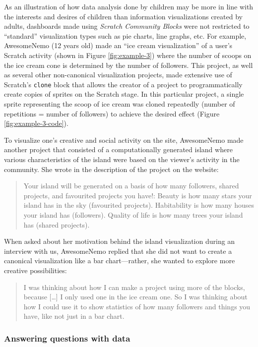 \documentclass{sigchi}
\begin{document}
As an illustration of how data analysis done by children may be more in line with the interests and desires of children than information visualizations created by adults, dashboards made using \emph{Scratch Community Blocks} were not restricted to ``standard'' visualization types such as pie charts, line graphs, etc. For example, AwesomeNemo (12 years old) made an ``ice cream visualization'' of a user's Scratch activity (shown in Figure \ref{fig:example-3}) where the number of scoops on the ice cream cone is determined by the number of followers. This project, as well as several other non-canonical visualization projects, made extensive use of Scratch's \texttt{clone} block that allows the creator of a project to programmatically create copies of sprites on the Scratch stage. In this particular project, a single sprite representing the scoop of ice cream was cloned repeatedly (number of repetitions = number of followers) to achieve the desired effect (Figure \ref{fig:example-3-code}).

To visualize one's creative and social activity on the site, AwesomeNemo made another project that consisted of a computationally generated island where various characteristics of the island were based on the viewer's activity in the community. She wrote in the description of the project on the website:

\begin{quote}
Your island will be generated on a basis of how many followers, shared projects, and favourited projects you have!: Beauty is how many stars your island has in the sky (favourited projects). Habitability is how many houses your island has (followers). Quality of life is how many trees your island has (shared projects).
\end{quote}

When asked about her motivation behind the island visualization during an interview with us, AwesomeNemo replied that she did not want to create a canonical visualization like a bar chart---rather, she wanted to explore more creative possibilities:

\begin{quote}
I was thinking about how I can make a project using more of the blocks, because [\ldots] I only used one in the ice cream one. So I was thinking about how I could use it to show statistics of how many followers and things you have, like not just in a bar chart.
\end{quote}

\subsubsection{Answering questions with data}
\end{document}

